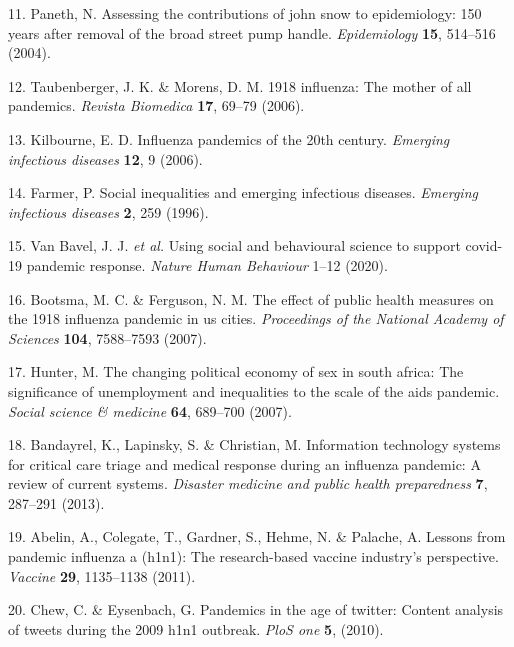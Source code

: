 \documentclass[]{article}
\begin{document}
\begin{cslreferences}
\leavevmode\hypertarget{ref-paneth2004assessing}{}%
11. Paneth, N. Assessing the contributions of john snow to epidemiology: 150 years after removal of the broad street pump handle. \emph{Epidemiology} \textbf{15}, 514--516 (2004).

\leavevmode\hypertarget{ref-taubenberger20061918}{}%
12. Taubenberger, J. K. \& Morens, D. M. 1918 influenza: The mother of all pandemics. \emph{Revista Biomedica} \textbf{17}, 69--79 (2006).

\leavevmode\hypertarget{ref-kilbourne2006influenza}{}%
13. Kilbourne, E. D. Influenza pandemics of the 20th century. \emph{Emerging infectious diseases} \textbf{12}, 9 (2006).

\leavevmode\hypertarget{ref-farmer1996social}{}%
14. Farmer, P. Social inequalities and emerging infectious diseases. \emph{Emerging infectious diseases} \textbf{2}, 259 (1996).

\leavevmode\hypertarget{ref-van2020using}{}%
15. Van Bavel, J. J. \emph{et al.} Using social and behavioural science to support covid-19 pandemic response. \emph{Nature Human Behaviour} 1--12 (2020).

\leavevmode\hypertarget{ref-bootsma2007effect}{}%
16. Bootsma, M. C. \& Ferguson, N. M. The effect of public health measures on the 1918 influenza pandemic in us cities. \emph{Proceedings of the National Academy of Sciences} \textbf{104}, 7588--7593 (2007).

\leavevmode\hypertarget{ref-hunter2007changing}{}%
17. Hunter, M. The changing political economy of sex in south africa: The significance of unemployment and inequalities to the scale of the aids pandemic. \emph{Social science \& medicine} \textbf{64}, 689--700 (2007).

\leavevmode\hypertarget{ref-bandayrel2013information}{}%
18. Bandayrel, K., Lapinsky, S. \& Christian, M. Information technology systems for critical care triage and medical response during an influenza pandemic: A review of current systems. \emph{Disaster medicine and public health preparedness} \textbf{7}, 287--291 (2013).

\leavevmode\hypertarget{ref-abelin2011lessons}{}%
19. Abelin, A., Colegate, T., Gardner, S., Hehme, N. \& Palache, A. Lessons from pandemic influenza a (h1n1): The research-based vaccine industry's perspective. \emph{Vaccine} \textbf{29}, 1135--1138 (2011).

\leavevmode\hypertarget{ref-chew2010pandemics}{}%
20. Chew, C. \& Eysenbach, G. Pandemics in the age of twitter: Content analysis of tweets during the 2009 h1n1 outbreak. \emph{PloS one} \textbf{5}, (2010).


\end{cslreferences}
\end{document}

